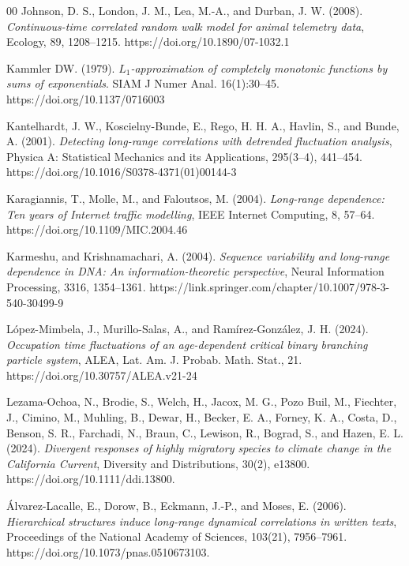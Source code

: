 \documentclass[preprint,12pt,authoryear]{elsarticle}
\begin{document}
\begin{thebibliography}{00}
  Johnson, D. S., London, J. M., Lea, M.-A., and Durban, J. W. (2008).
  \textit{Continuous-time correlated random walk model for animal telemetry data},
  Ecology,
  89,
  1208–1215. https://doi.org/10.1890/07-1032.1

 Kammler DW. (1979). {\it $L_1$-approximation of completely monotonic functions by sums of exponentials}. SIAM J Numer Anal. 16(1):30--45. https://doi.org/10.1137/0716003

  Kantelhardt, J. W., Koscielny-Bunde, E., Rego, H. H. A., Havlin, S., and Bunde, A. (2001).
  \textit{Detecting long-range correlations with detrended fluctuation analysis},
  Physica A: Statistical Mechanics and its Applications,
  295(3--4),
  441--454. https://doi.org/10.1016/S0378-4371(01)00144-3

  Karagiannis, T., Molle, M., and Faloutsos, M. (2004). 
  \textit{Long-range dependence: Ten years of Internet traffic modelling},
  IEEE Internet Computing,
  8,
  57–64.  https://doi.org/10.1109/MIC.2004.46

  Karmeshu, and Krishnamachari, A. (2004).
  \textit{Sequence variability and long-range dependence in DNA: An information-theoretic perspective},
  Neural Information Processing,
  3316,
  1354–1361. https://link.springer.com/chapter/10.1007/978-3-540-30499-9

  López-Mimbela, J., Murillo-Salas, A., and Ramírez-González, J. H. (2024).
  \textit{Occupation time fluctuations of an age-dependent critical binary branching particle system},
  ALEA, Lat. Am. J. Probab. Math. Stat.,
  21. https://doi.org/10.30757/ALEA.v21-24

  Lezama-Ochoa, N., Brodie, S., Welch, H., Jacox, M. G., Pozo Buil, M., Fiechter, J., Cimino, M., Muhling, B., Dewar, H., Becker, E. A., Forney, K. A., Costa, D., Benson, S. R., Farchadi, N., Braun, C., Lewison, R., Bograd, S., and Hazen, E. L. (2024).
  \textit{Divergent responses of highly migratory species to climate change in the California Current},
  Diversity and Distributions,
  30(2),
  e13800.
  https://doi.org/10.1111/ddi.13800.

Álvarez-Lacalle, E., Dorow, B., Eckmann, J.-P., and Moses, E. (2006). \textit{Hierarchical structures induce long-range dynamical correlations in written texts},
Proceedings of the National Academy of Sciences,
103(21),
7956--7961.
https://doi.org/10.1073/pnas.0510673103.


\end{thebibliography}
\end{document}
